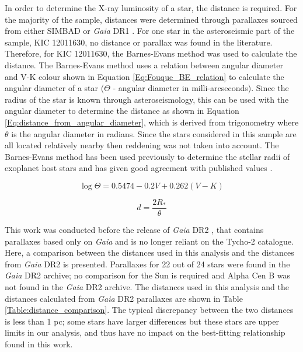 In order to determine the X-ray luminosity of a star, the distance is required. For the majority of the sample, distances were determined through parallaxes sourced from either SIMBAD \citep{Wenger_etal_2000} or \textit{Gaia} DR1 \citep{Gaia_Collaboration_2016_DR1}. For one star in the asteroseismic part of the sample, KIC 12011630, no distance or parallax was found in the literature. Therefore, for KIC 12011630, the Barnes-Evans method was used to calculate the distance. The Barnes-Evans method uses a relation between angular diameter and V-K colour \citep{Fouque_Gieren_1997} shown in Equation \ref{Eq:Fouque_BE_relation} to calculate the angular diameter of a star ($\Theta$ - angular diameter in milli-arcseconds). Since the radius of the star is known through asteroseismology, this can be used with the angular diameter to determine the distance as shown in Equation \ref{Eq:distance_from_angular_diameter}, which is derived from trigonometry where $\theta$ is the angular diameter in radians. Since the stars considered in this sample are all located relatively nearby then reddening was not taken into account. The Barnes-Evans method has been used previously to determine the stellar radii of exoplanet host stars and has given good agreement with published values \citep{Watson_etal_2010}.

\begin{equation}
    \log\Theta = 0.5474 - 0.2V + 0.262(V-K)
    \label{Eq:Fouque_BE_relation}
\end{equation}

\begin{equation}
    d = \frac{2R_{*}}{\theta}
    \label{Eq:distance_from_angular_diameter}
\end{equation}

This work was conducted before the release of \textit{Gaia} DR2 \citep{Gaia_collaboration_2018}, that contains parallaxes based only on \textit{Gaia} and is no longer reliant on the Tycho-2 catalogue. Here, a comparison between the distances used in this analysis and the distances from \textit{Gaia} DR2 is presented. Parallaxes for 22 out of 24 stars were found in the \textit{Gaia} DR2 archive; no comparison for the Sun is required and Alpha Cen B was not found in the \textit{Gaia} DR2 archive. The distances used in this analysis and the distances calculated from \textit{Gaia} DR2 parallaxes are shown in Table \ref{Table:distance_comparison}. The typical discrepancy between the two distances is less than 1 pc; some stars have larger differences but these stars are upper limits in our analysis, and thus have no impact on the best-fitting relationship found in this work.

